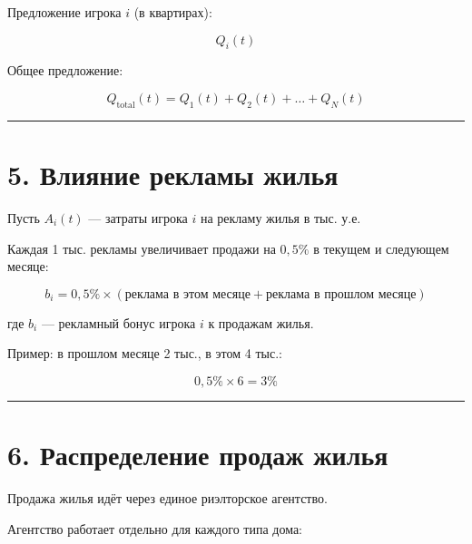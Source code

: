 \documentclass[
]{article}
\begin{document}
Предложение игрока \(i\) (в квартирах):

\[
Q_i(t)
\]

Общее предложение:

\[
Q_{\text{total}}(t)
=
Q_1(t)
+
Q_2(t)
+
\dots
+
Q_N(t)
\]

\begin{center}\rule{0.5\linewidth}{0.5pt}\end{center}

\section{5. Влияние рекламы
жилья}\label{ux432ux43bux438ux44fux43dux438ux435-ux440ux435ux43aux43bux430ux43cux44b-ux436ux438ux43bux44cux44f}

Пусть \(A_i(t)\) --- затраты игрока \(i\) на рекламу жилья в тыс. у.е.

Каждая 1 тыс. рекламы увеличивает продажи на \(0{,}5\%\) в текущем и
следующем месяце:

\[
b_i
=
0{,}5\%
\times
\left(
\text{реклама в этом месяце}
+
\text{реклама в прошлом месяце}
\right)
\]

где \(b_i\) --- рекламный бонус игрока \(i\) к продажам жилья.

Пример: в прошлом месяце 2 тыс., в этом 4 тыс.:

\[
0{,}5\% \times 6 = 3\%
\]

\begin{center}\rule{0.5\linewidth}{0.5pt}\end{center}

\section{6. Распределение продаж
жилья}\label{ux440ux430ux441ux43fux440ux435ux434ux435ux43bux435ux43dux438ux435-ux43fux440ux43eux434ux430ux436-ux436ux438ux43bux44cux44f}

Продажа жилья идёт через единое риэлторское агентство.

Агентство работает отдельно для каждого типа дома:
\end{document}
